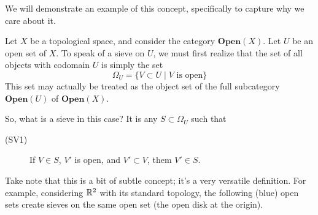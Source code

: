 We will demonstrate an example of this concept, specifically to capture why we care 
about it. 

\begin{example}
    Let $X$ be a topological space, and consider the category $\textbf{Open}(X)$. 
    Let $U$ be an open set of $X$. To speak of a sieve on $U$, 
    we must first realize that the set of all objects with codomain $U$ is 
    simply the set 
    \[
        \Omega_U = \{V \subset U \mid V \text{ is open}\}
    \]
    This set may actually be treated as the object set of the full subcategory $\textbf{Open}(U)$ 
    of $\textbf{Open}(X)$.
    
    So, what is a sieve in this case? It is any $S \subset \Omega_U$ such that 
    \begin{description}
        \item[(SV1)] If $V \in S$, $V'$ is open, and $V' \subset V$, them $V' \in S$. 
    \end{description}
    Take note that this is a bit of subtle concept; it's a very versatile definition. 
    For example, considering $\mathbb{R}^2$ with its standard topology, the following 
    (blue) open sets create sieves on the same open set (the open disk at the origin).
    \begin{center}
\end{center}
\end{example}
